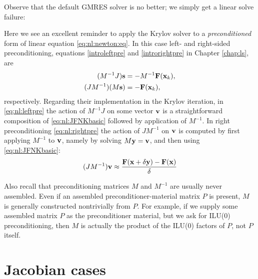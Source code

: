 Observe that the default GMRES solver is no better; we simply get a linear solve failure:

Here we see an excellent reminder to apply the Krylov solver to a \emph{preconditioned} form of linear equation \eqref{eq:nl:newton:eq}.  In this case left- and right-sided preconditioning, equations \eqref{introleftpre} and \eqref{introrightpre} in Chapter \ref{chap:ls}, are
\begin{align}
(M^{-1} J) \mathbf{s} &= - M^{-1} \mathbf{F}(\mathbf{x}_k), \label{eq:nl:leftpre} \\
(J M^{-1}) (M \mathbf{s}) &= - \mathbf{F}(\mathbf{x}_k), \label{eq:nl:rightpre}
\end{align}
respectively.  Regarding their implementation in the Krylov iteration, in \eqref{eq:nl:leftpre} the action of $M^{-1} J$ on some vector $\mathbf{v}$ is a straightforward composition of \eqref{eq:nl:JFNKbasic} followed by application of $M^{-1}$.  In right preconditioning \eqref{eq:nl:rightpre} the action of $J M^{-1}$ on $\mathbf{v}$ is computed by first applying $M^{-1}$ to $\mathbf{v}$, namely by solving $M \mathbf{y} = \mathbf{v}$, and then using \eqref{eq:nl:JFNKbasic}:
\begin{equation}
(J M^{-1}) \mathbf{v} \approx \frac{\mathbf{F}(\mathbf{x}+\delta \mathbf{y}) - \mathbf{F}(\mathbf{x})}{\delta} \label{eq:nl:JFNKwithrightpre}
\end{equation}

Also recall that preconditioning matrices $M$ and $M^{-1}$ are usually never assembled.  Even if an assembled preconditioner-material matrix $P$ is present, $M$ is generally constructed nontrivially from $P$.  For example, if we supply some assembled matrix $P$ as the preconditioner material, but we ask for ILU($0$) preconditioning, then $M$ is actually the product of the ILU($0$) factors of $P$, not $P$ itself.


\section{Jacobian cases} \label{sec:jacobiancases}

\def\checkmark{\tikz\fill[scale=0.4](0,.35) -- (.25,0) -- (.7,.8) -- (.25,.15) -- cycle;}
\def\bigcheckmark{\tikz\fill[scale=0.6](0,.35) -- (.25,0) -- (.7,.8) -- (.25,.15) -- cycle;}

